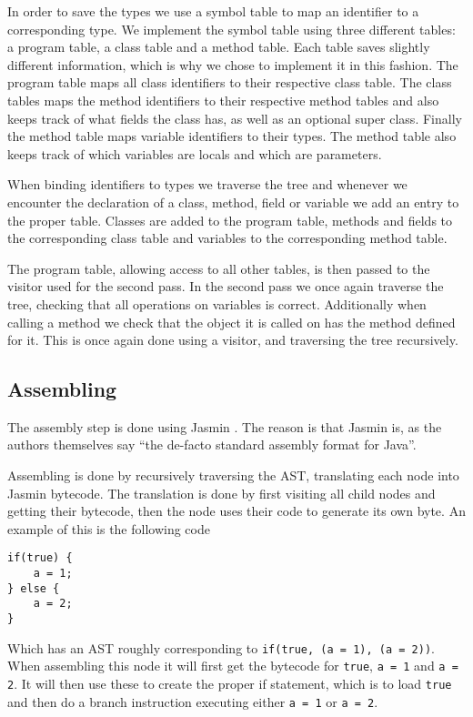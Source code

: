 \documentclass[a4paper]{article}
\begin{document}
In order to save the types we use a symbol table to map an identifier to a
corresponding type. We implement the symbol table using three different
tables: a program table, a class table and a method table. Each table saves
slightly different information, which is why we chose to implement it in this
fashion. The program table maps all class identifiers to their respective class
table. The class tables maps the method identifiers to their respective method
tables and also keeps track of what fields the class has, as well as an optional
super class. Finally the method table maps variable identifiers to their types.
The method table also keeps track of which variables are locals and which are
parameters.

When binding identifiers to types we traverse the tree and whenever we encounter
the declaration of a class, method, field or variable we add an entry to the
proper table. Classes are added to the program table, methods and fields to the
corresponding class table and variables to the corresponding method table.

The program table, allowing access to all other tables, is then passed to the
visitor used for the second pass. In the second pass we once again traverse the
tree, checking that all operations on variables is correct. Additionally when
calling a method we check that the object it is called on has the method defined
for it. This is once again done using a visitor, and traversing the tree
recursively.

\subsection{Assembling}

The assembly step is done using Jasmin \cite{jasmin}. The reason is that
Jasmin is, as the authors themselves say ``the de-facto standard assembly format for Java''.

Assembling is done by recursively traversing the AST, translating each node into Jasmin
bytecode. The translation is done by first visiting all child nodes and getting their
bytecode, then the node uses their code to generate its own byte. An example of
this is the following code

\begin{lstlisting}
if(true) {
    a = 1;
} else {
    a = 2;
}
\end{lstlisting}

Which has an AST roughly corresponding to \texttt{if(true, (a = 1), (a = 2))}.
When assembling this node it will first get the bytecode for \texttt{true}, \texttt{a = 1}
and \texttt{a = 2}. It will then use these to create the proper if statement, which is
to load \texttt{true} and then do a branch instruction executing either \texttt{a = 1} or
\texttt{a = 2}.
\end{document}
